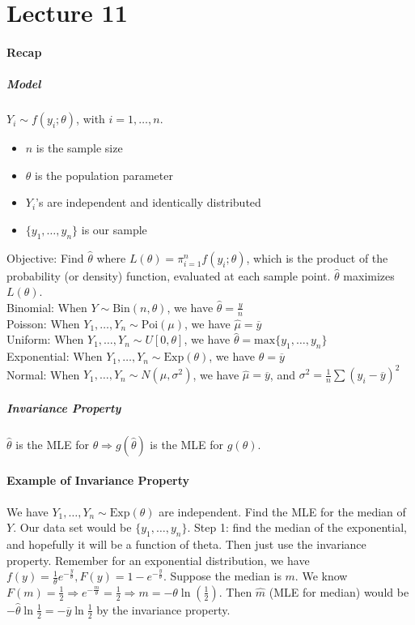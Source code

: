 \documentclass[10pt,letter]{article}
\theoremstyle{plain}
\theoremstyle{definition}
\begin{document}
\section*{Lecture 11}
\paragraph{Recap}
\subparagraph{Model} $Y_i\sim f(y_i;\theta)$, with $i=1,\ldots,n$. \begin{itemize}
    \item $n$ is the sample size 
    \item $\theta$ is the population parameter 
    \item $Y_i$'s are independent and identically distributed
    \item $\{y_1,\ldots,y_n\}$ is our sample 
\end{itemize}
Objective: Find $\hat{\theta}$ where $L(\theta)=\pi_{i=1}^nf(y_i;\theta)$, which is the product of the probability (or density) function, evaluated at each sample point. $\hat{\theta}$ maximizes $L(\theta)$. \\ 
Binomial: When $Y\sim\text{Bin}(n,\theta)$, we have $\hat{\theta}=\frac{y}{n}$\\ 
Poisson: When $Y_1,\ldots,Y_n\sim\text{Poi}(\mu)$, we have $\hat{\mu}=\overline{y}$ \\ 
Uniform: When $Y_1,\ldots,Y_n\sim U[0,\theta]$, we have $\hat{\theta}=\text{max}\{y_1,\ldots,y_n\}$ \\ 
Exponential: When $Y_1,\ldots,Y_n\sim\text{Exp}(\theta)$, we have $\hat{\theta}=\overline{y}$ \\ 
Normal: When $Y_1,\ldots,Y_n\sim N(\mu,\sigma^2)$, we have $\hat{\mu}=\overline{y}$, and $\sigma^2=\frac{1}{n}\sum(y_i-\overline{y})^2$
\subparagraph{Invariance Property}
$\hat{\theta}$ is the MLE for $\theta\Rightarrow g(\hat{\theta})$ is the MLE for $g(\theta)$.  

\paragraph{Example of Invariance Property}
We have $Y_1,\ldots,Y_n\sim\text{Exp}(\theta)$ are independent. Find the MLE for the median of $Y$. Our data set would be $\{y_1,\ldots,y_n\}$. Step 1: find the median of the exponential, and hopefully it will be a function of theta. Then just use the invariance property. Remember for an exponential distribution, we have $f(y)=\frac{1}{\theta}e^{-\frac{y}{\theta}}, F(y)=1-e^{-\frac{y}{\theta}}$. Suppose the median is $m$. We know $F(m)=\frac{1}{2}\Rightarrow e^{-\frac{m}{\theta}}=\frac{1}{2}\Rightarrow m=-\theta\ln\left(\frac{1}{2}\right)$. Then $\hat{m}$ (MLE for median) would be $-\hat{\theta}\ln\frac{1}{2}=-\overline{y}\ln\frac{1}{2}$ by the invariance property. 
\end{document}
